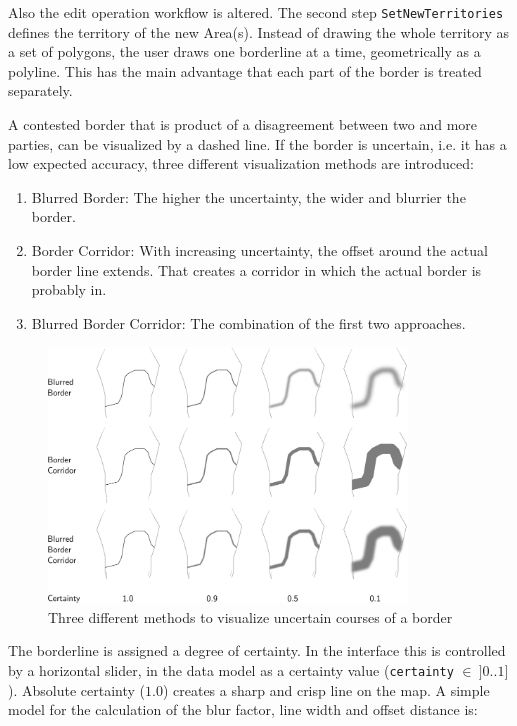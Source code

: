 Also the edit operation workflow is altered. The second step \texttt{SetNewTerritories} defines the territory of the new Area(s). Instead of drawing the whole territory as a set of polygons, the user draws one borderline at a time, geometrically as a polyline. This has the main advantage that each part of the border is treated separately.

A contested border that is product of a disagreement between two and more parties, can be visualized by a dashed line. If the border is uncertain, i.e. it has a low expected accuracy, three different visualization methods are introduced:

\begin{enumerate}
  \item Blurred Border: The higher the uncertainty, the wider and blurrier the border.
  \item Border Corridor: With increasing uncertainty, the offset around the actual border line extends. That creates a corridor in which the actual border is probably in.
  \item Blurred Border Corridor: The combination of the first two approaches.
\end{enumerate}

\begin{figure}[ht]
  \vspace{1em}
  \centering
  \includegraphics[width=0.85\textwidth]{graphics/extensions/border}
  \caption{Three different methods to visualize uncertain courses of a border}
  \label{fig:uncertainty_border}
\end{figure}

The borderline is assigned a degree of certainty. In the interface this is controlled by a horizontal slider, in the data model as a certainty value (\texttt{certainty} $\in~]0 .. 1]$). Absolute certainty ($1.0$) creates a sharp and crisp line on the map. A simple model for the calculation of the blur factor, line width and offset distance is:

